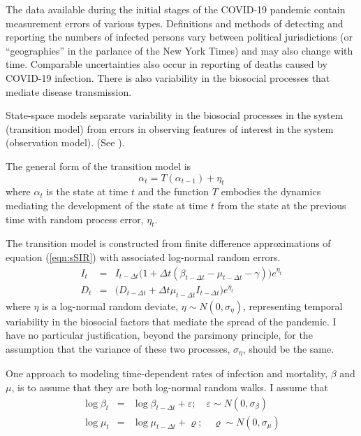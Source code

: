 \documentclass[12pt,letterpaper]{article}
\begin{document}
The data available during the initial stages of the COVID-19 pandemic
contain measurement errors of various types.
Definitions and methods of detecting and reporting the numbers of
infected persons vary between political jurisdictions (or
``geographies'' in the parlance of the New York Times) and may also
change with time.
Comparable uncertainties also occur in reporting of deaths caused
by COVID-19 infection.
There is also variability in the biosocial
processes that mediate disease transmission.

State-space models separate variability in the biosocial
processes in the system (transition model)
from errors in observing features of interest
in the system (observation model).
(See \cite{Harvey1990}).

The general form of the transition model is
\begin{displaymath}
\alpha_t=T(\alpha_{t-1}) + \eta_t
\end{displaymath}
where $\alpha_t$ is the state at time $t$ and 
the function $T$ embodies the dynamics mediating the
development of the state at time $t$ from the state at the previous
time with random process error, $\eta_t$.

The transition model is constructed from finite difference
approximations of equation (\ref{eqn:sSIR}) with associated log-normal
random errors.
\begin{eqnarray}
\label{eqn:sSIRfd}
I_t &=& I_{t-\Delta t}\big(1+\Delta t(\beta_{t-\Delta t} - \mu_{t-\Delta t}
- \gamma)\big)e^{\eta_t}\\
D_t &=& \big(D_{t-\Delta t} + \Delta t \mu_{t-\Delta t}I_{t-\Delta
t}\big)e^{\eta_t}
\end{eqnarray}
where $\eta$ is a log-normal random deviate, $\eta\sim
N(0,\sigma_\eta)$, representing temporal variability in the biosocial
factors that mediate the spread of the pandemic. I have no particular
justification, beyond the parsimony principle, for the assumption that
the variance of these two processes, $\sigma_\eta$, should be the
same.

One approach to modeling time-dependent rates of infection and
mortality, $\beta$ and $\mu$, is to assume that they are both
log-normal random walks. I assume that
\begin{eqnarray}
\log\beta_t &=& \log\beta_{t-\Delta t}+\varepsilon;\quad \varepsilon\sim 
N(0,\sigma_\beta)\\
\log\mu_t &=& \log\mu_{t-\Delta t}+\varrho;\quad \varrho\sim
N(0,\sigma_\mu)
\end{eqnarray}
\end{document}
